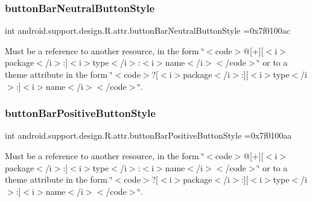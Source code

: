 \subsubsection{\texorpdfstring{button\+Bar\+Neutral\+Button\+Style}{buttonBarNeutralButtonStyle}}
{\footnotesize\ttfamily int android.\+support.\+design.\+R.\+attr.\+button\+Bar\+Neutral\+Button\+Style =0x7f0100ac\hspace{0.3cm}{\ttfamily [static]}}

Must be a reference to another resource, in the form \char`\"{}$<$code$>$@\mbox{[}+\mbox{]}\mbox{[}$<$i$>$package$<$/i$>$\+:\mbox{]}$<$i$>$type$<$/i$>$\+:$<$i$>$name$<$/i$>$$<$/code$>$\char`\"{} or to a theme attribute in the form \char`\"{}$<$code$>$?\mbox{[}$<$i$>$package$<$/i$>$\+:\mbox{]}\mbox{[}$<$i$>$type$<$/i$>$\+:\mbox{]}$<$i$>$name$<$/i$>$$<$/code$>$\char`\"{}. \mbox{\label{classandroid_1_1support_1_1design_1_1R_1_1attr_a2048c6806bc0c63b5b6d67b3e669df1c}} 
\subsubsection{\texorpdfstring{button\+Bar\+Positive\+Button\+Style}{buttonBarPositiveButtonStyle}}
{\footnotesize\ttfamily int android.\+support.\+design.\+R.\+attr.\+button\+Bar\+Positive\+Button\+Style =0x7f0100aa\hspace{0.3cm}{\ttfamily [static]}}

Must be a reference to another resource, in the form \char`\"{}$<$code$>$@\mbox{[}+\mbox{]}\mbox{[}$<$i$>$package$<$/i$>$\+:\mbox{]}$<$i$>$type$<$/i$>$\+:$<$i$>$name$<$/i$>$$<$/code$>$\char`\"{} or to a theme attribute in the form \char`\"{}$<$code$>$?\mbox{[}$<$i$>$package$<$/i$>$\+:\mbox{]}\mbox{[}$<$i$>$type$<$/i$>$\+:\mbox{]}$<$i$>$name$<$/i$>$$<$/code$>$\char`\"{}. \mbox{\label{classandroid_1_1support_1_1design_1_1R_1_1attr_aa4640454ea301f1d5b7b31f4b2486d9f}} 
